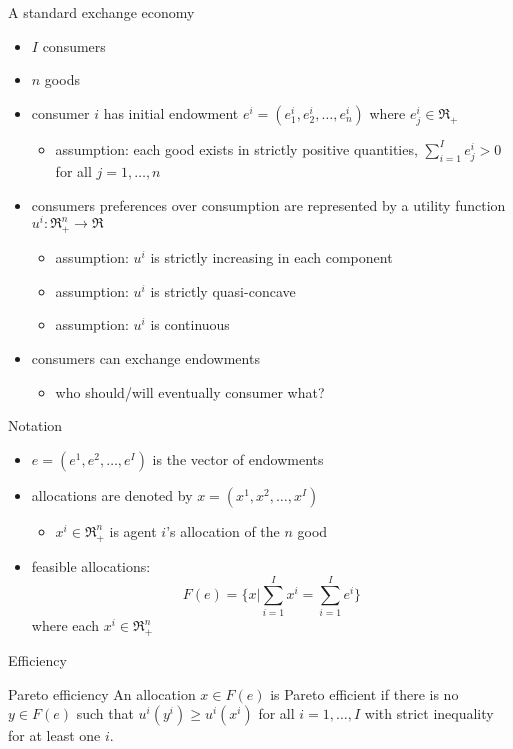 \documentclass[bigger]{beamer}
\begin{document}
\begin{frame}[label={sec:orgc03043a}]{A standard exchange economy}
\begin{itemize}
\item \(I\) consumers
\item \(n\) goods
\item consumer \(i\) has initial endowment \(e^i=(e_1^i,e_2^i,\dots,e_n^i)\) where \(e^i_j\in\Re_+\)
\begin{itemize}
\item assumption: each good exists in strictly positive quantities, \(\sum_{i=1}^Ie_j^i>0\) for all \(j=1,\dots,n\)
\end{itemize}
\item consumers preferences over consumption are represented by a utility function \(u^i:\Re_+^n\rightarrow\Re\)
\begin{itemize}
\item assumption: \(u^i\) is strictly increasing in each component
\item assumption: \(u^i\) is strictly quasi-concave
\item assumption: \(u^i\) is continuous
\end{itemize}
\item consumers can exchange endowments
\begin{itemize}
\item who should/will eventually consumer what?
\end{itemize}
\end{itemize}
\end{frame}
\begin{frame}[label={sec:orgf135851}]{Notation}
\begin{itemize}
\item \(e=(e^1,e^2,\dots, e^I)\) is the vector of endowments
\item allocations are denoted by \(x=(x^1,x^2,\dots ,x^I)\)
\begin{itemize}
\item \(x^i\in \Re^n_+\) is agent \(i\)'s allocation of the \(n\) good
\end{itemize}
\item feasible allocations:
$$F(e)=\{x|\sum_{i=1}^Ix^i=\sum_{i=1}^Ie^i\}$$
where each \(x^i\in\Re^n_+\)
\end{itemize}
\end{frame}

\begin{frame}[label={sec:org0058afe}]{Efficiency}
\begin{block}{Pareto efficiency}
An allocation \(x\in F(e)\) is Pareto efficient if there is no \(y\in F(e)\) such that \(u^i(y^i)\geq u^i(x^i)\) for all \(i=1,\dots,I\) with strict inequality for at least one \(i\).
\end{block}
\end{frame}
\end{document}
